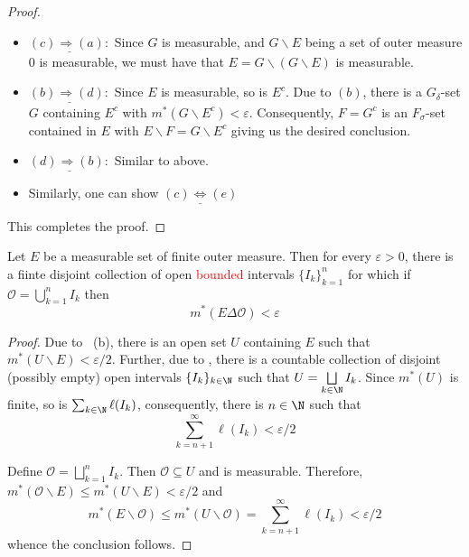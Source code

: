 \begin{proof}
\begin{itemize}
    \item $\underline{(c)\Longrightarrow(a):}$ Since $G$ is measurable, and $G\backslash E$ being a set of outer measure $0$ is measurable, we must have that $E = G\backslash(G\backslash E)$ is measurable.

    \item $\underline{(b)\Longrightarrow(d):}$ Since $E$ is measurable, so is $E^c$. Due to $(b)$, there is a $G_\delta$-set $G$ containing $E^c$ with $m^*(G\backslash E^c) < \varepsilon$. Consequently, $F = G^c$ is an $F_\sigma$-set contained in $E$ with $E\backslash F = G\backslash E^c$ giving us the desired conclusion.

    \item $\underline{(d)\Longrightarrow(b):}$ Similar to above.

    \item Similarly, one can show $\underline{(c)\Longleftrightarrow(e)}$
\end{itemize}

This completes the proof.
\end{proof}

\begin{theorem}
    Let $E$ be a measurable set of finite outer measure. Then for every $\varepsilon > 0$, there is a fiinte disjoint collection of open \textcolor{red}{bounded} intervals $\{I_k\}_{k = 1}^n$ for which if $\mathcal O = \bigcup_{k = 1}^n I_k$ then 
    \begin{equation*}
        m^*(E\Delta\mathcal O) < \varepsilon
    \end{equation*}
\end{theorem}
\begin{proof}
    Due to ~(b), there is an open set $U$ containing $E$ such that $m^*(U\backslash E) < \varepsilon/2$. Further, due to , there is a countable collection of disjoint (possibly empty) open intervals $\{I_k\}_{k\in\N}$ such that $U = \bigsqcup\limits_{k\in\N} I_k$. Since $m^*(U)$ is finite, so is $\sum_{k\in\N}\ell(I_k)$, consequently, there is $n\in\N$ such that 
    \begin{equation*}
        \sum_{k = n + 1}^\infty\ell(I_k) < \varepsilon/2
    \end{equation*}

    Define $\mathcal O = \bigsqcup\limits_{k = 1}^n I_k$. Then $\mathcal O\subseteq U$ and is measurable. Therefore, $m^*(\mathcal O\backslash E)\le m^*(U\backslash E) < \varepsilon/2$ and 
    \begin{equation*}
        m^*(E\backslash\mathcal O)\le m^*(U\backslash\mathcal O) = \sum_{k = n + 1}^\infty\ell(I_k) < \varepsilon/2
    \end{equation*}
    whence the conclusion follows.
\end{proof}

